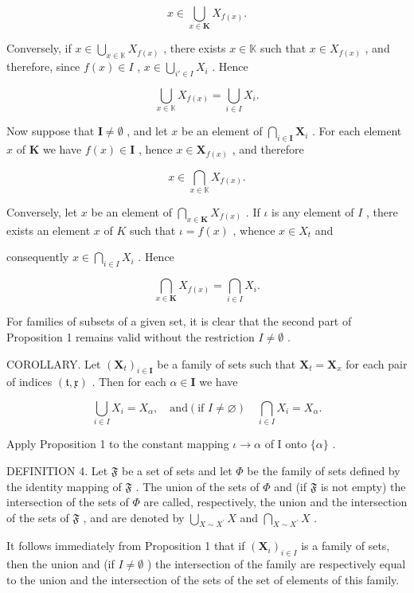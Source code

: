 \[
x \in \bigcup_ {x \in \mathbf {K}} X _ {f (x)}.
\]

Conversely, if \(x \in \bigcup_{x \in \mathbb{K}} X_{f(x)}\) , there exists \(x \in \mathbb{K}\) such that \(x \in X_{f(x)}\) , and therefore, since \(f(x) \in I\) , \(x \in \bigcup_{i' \in I} X_i\) . Hence

\[
\bigcup_ {x \in \mathbb {K}} X _ {f (x)} = \bigcup_ {i \in I} X _ {i}.
\]

Now suppose that \(\mathbf{I} \neq \emptyset\) , and let \(x\) be an element of \(\bigcap_{i \in \mathbf{I}} \mathbf{X}_i\) . For each element \(x\) of \(\mathbf{K}\) we have \(f(x) \in \mathbf{I}\) , hence \(x \in \mathbf{X}_{f(x)}\) , and therefore

\[
x \in \bigcap_ {x \in \mathbb {K}} X _ {f (x)}.
\]

Conversely, let \(x\) be an element of \(\bigcap_{x \in \mathbf{K}} X_{f(x)}\) . If \(\iota\) is any element of \(I\) , there exists an element \(x\) of \(K\) such that \(\iota = f(x)\) , whence \(x \in X_t\) and

consequently \(x \in \bigcap_{i \in I} X_i\) . Hence

\[
\bigcap_ {x \in \mathbf {K}} X _ {f (x)} = \bigcap_ {i \in I} X _ {i}.
\]

For families of subsets of a given set, it is clear that the second part of Proposition 1 remains valid without the restriction \(I \neq \emptyset\) .

COROLLARY. Let \((\mathbf{X}_t)_{i\in \mathbf{I}}\) be a family of sets such that \(\mathbf{X}_t = \mathbf{X}_x\) for each pair of indices \((\mathfrak{t},\mathfrak{x})\) . Then for each \(\alpha \in \mathbf{I}\) we have

\[
\bigcup_ {i \in I} X _ {i} = X _ {\alpha}, \quad \text{and} (\text{if } I \neq \varnothing) \quad \bigcap_ {i \in I} X _ {i} = X _ {\alpha}.
\]

Apply Proposition 1 to the constant mapping \(\iota\to\alpha\) of I onto \(\{\alpha\}\) .

DEFINITION 4. Let \(\mathfrak{F}\) be a set of sets and let \(\Phi\) be the family of sets defined by the identity mapping of \(\mathfrak{F}\) . The union of the sets of \(\Phi\) and (if \(\mathfrak{F}\) is not empty) the intersection of the sets of \(\Phi\) are called, respectively, the union and the intersection of the sets of \(\mathfrak{F}\) , and are denoted by \(\bigcup_{X\sim X^{\prime}}X\) and \(\bigcap_{X\sim X^{\prime}}X\) .

It follows immediately from Proposition 1 that if \((\mathbf{X}_i)_{i\in I}\) is a family of sets, then the union and (if \(I\neq \emptyset\) ) the intersection of the family are respectively equal to the union and the intersection of the sets of the set of elements of this family.

